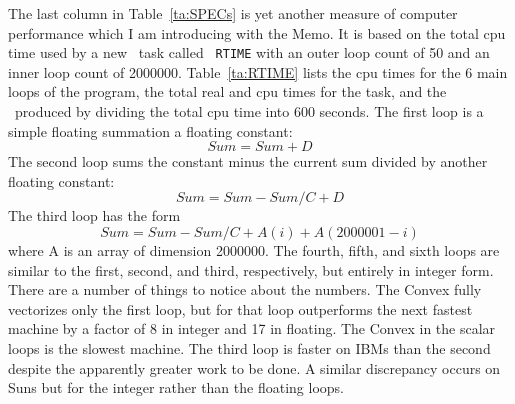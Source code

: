 The last column in Table~\ref{ta:SPECs} is yet another measure of
computer performance which I am introducing with the Memo.  It is
based on the total cpu time used by a new \AIPS\ task called {\tt
RTIME} with an outer loop count of 50 and an inner loop count of
2000000.  Table~\ref{ta:RTIME} lists the cpu times for the 6 main
loops of the program, the total real and cpu times for the task, and
the \LMark\ produced by dividing the total cpu time into 600 seconds.
The first loop is a simple floating summation a floating constant:
      $$ Sum = Sum + D$$
The second loop sums the constant minus the current sum divided by
another floating constant:
      $$ Sum = Sum - Sum / C + D $$
The third loop has the form
      $$ Sum = Sum - Sum / C + A(i) + A(2000001-i) $$
where A is an array of dimension 2000000.  The fourth, fifth, and
sixth loops are similar to the first, second, and third, respectively,
but entirely in integer form.  There are a number of things to notice
about the numbers.  The Convex fully vectorizes only the first loop,
but for that loop outperforms the next fastest machine by a factor of
8 in integer and 17 in floating.  The Convex in the scalar loops is
the slowest machine.  The third loop is faster on IBMs than the second
despite the apparently greater work to be done.  A similar discrepancy
occurs on Suns but for the integer rather than the floating loops.
